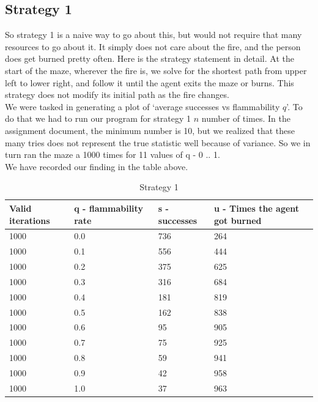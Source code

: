 \documentclass[11pt]{scrartcl} %
\begin{document}
\subsection{Strategy 1}
So strategy 1 is a naive way to go about this, but would not require that many resources to go about it. It simply does not care about the fire, and the person does get burned pretty often. Here is the strategy statement in detail. At the start of the maze, wherever the fire is, we solve for the shortest path from upper left to lower right, and follow  it  until the  agent  exits  the  maze  or  burns.   This  strategy  does  not  modify  its  initial  path  as  the  fire changes.
\vspace{2em}\\
We were tasked in generating a plot of ‘average successes vs flammability $q$’. To do that we had to run our program for strategy 1 $n$ number of times. In the assignment document, the minimum number is 10, but we realized that these many tries does not represent the true statistic well because of variance. So we in turn ran the maze a 1000 times for 11 values of q - 0 .. 1. \\
We have recorded our finding in the table above.\\
\begin{table}[!htb]
\caption{Strategy 1}
\begin{tabular}{|l|l|l|l|}
\hline
\textbf{Valid iterations} & \textbf{q - flammability rate} & \textbf{s - successes} & \textbf{u - Times the agent got burned} \\ \hline
1000 & 0.0   & 736 & 264 \\ \hline
1000 & 0.1 & 556 & 444 \\ \hline
1000 & 0.2 & 375 & 625 \\ \hline
1000 & 0.3 & 316 & 684 \\ \hline
1000 & 0.4 & 181 & 819 \\ \hline
1000 & 0.5 & 162 & 838 \\ \hline
1000 & 0.6 & 95  & 905 \\ \hline
1000 & 0.7 & 75  & 925 \\ \hline
1000 & 0.8 & 59  & 941 \\ \hline
1000 & 0.9 & 42  & 958 \\ \hline
1000 & 1.0   & 37  & 963 \\ \hline
\end{tabular}
\end{table}
\end{document}
